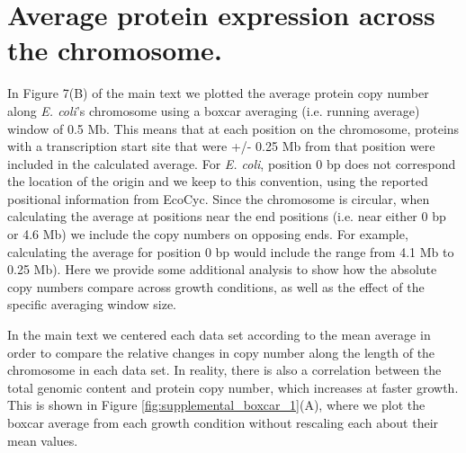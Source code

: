 \section{Average protein expression across the chromosome.}

In Figure 7(B) of the main text we plotted the average protein copy number along
\textit{E. coli}'s chromosome using a boxcar averaging (i.e. running average)
window of 0.5 Mb. This means that at each position on the chromosome, proteins
with a transcription start site that were +/- 0.25 Mb from that position
were  included in the calculated average. For \textit{E. coli},
position 0 bp does not correspond the location of the origin and we  keep to
this convention, using the reported positional information from EcoCyc. Since
the chromosome is circular, when calculating the  average at positions  near the
end positions (i.e. near either 0 bp or 4.6 Mb) we include the copy numbers
on opposing ends.  For example, calculating the average for position 0 bp would
include the range from 4.1 Mb to 0.25 Mb).  Here we provide some additional
analysis to show how the absolute copy numbers compare across growth conditions,
as well as the effect of the specific averaging window size.

In the main text we centered each data set according to the mean average in order
to  compare the relative changes in copy number along the length of the
chromosome in each data set. In reality, there is also a correlation between the
total genomic content and protein copy number, which increases at faster growth.
This is shown in Figure \ref{fig:supplemental_boxcar_1}(A), where we plot the boxcar average from each
growth condition without rescaling each about their mean values.

